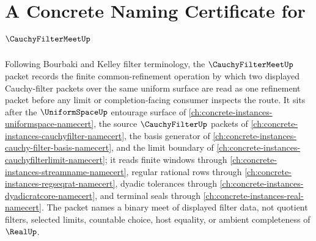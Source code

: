 \chapter{A Concrete Naming Certificate for $\CauchyFilterMeetUp$}
\label{ch:concrete-instances-cauchy-filter-meet-namecert}

Following Bourbaki and Kelley filter terminology, the $\CauchyFilterMeetUp$ packet records the finite common-refinement operation by which two displayed Cauchy-filter packets over the same uniform surface are read as one refinement packet before any limit or completion-facing consumer inspects the route. It sits after the $\UniformSpaceUp$ entourage surface of \autoref{ch:concrete-instances-uniformspace-namecert}, the source $\CauchyFilterUp$ packets of \autoref{ch:concrete-instances-cauchyfilter-namecert}, the basis generator of \autoref{ch:concrete-instances-cauchy-filter-basis-namecert}, and the limit boundary of \autoref{ch:concrete-instances-cauchyfilterlimit-namecert}; it reads finite windows through \autoref{ch:concrete-instances-streamname-namecert}, regular rational rows through \autoref{ch:concrete-instances-regseqrat-namecert}, dyadic tolerances through \autoref{ch:concrete-instances-dyadicratcore-namecert}, and terminal seals through \autoref{ch:concrete-instances-real-namecert}. The packet names a binary meet of displayed filter data, not quotient filters, selected limits, countable choice, host equality, or ambient completeness of $\RealUp$.

